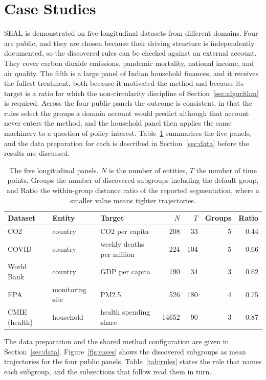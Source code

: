 \section{Case Studies}
\label{sec:cases}

SEAL is demonstrated on five longitudinal datasets from different domains. Four are public, and they are chosen because their driving structure is independently documented, so the discovered rules can be checked against an external account. They cover carbon dioxide emissions, pandemic mortality, national income, and air quality. The fifth is a large panel of Indian household finances, and it receives the fullest treatment, both because it motivated the method and because its target is a ratio for which the non-circularity discipline of Section~\ref{sec:algorithm} is required. Across the four public panels the outcome is consistent, in that the rules select the groups a domain account would predict although that account never enters the method, and the household panel then applies the same machinery to a question of policy interest. Table~\ref{tab:datasets} summarises the five panels, and the data preparation for each is described in Section~\ref{sec:data} before the results are discussed.

\begin{table}[t]
\centering
\small
\begin{tabular}{lllrrrr}
\toprule
Dataset & Entity & Target & $N$ & $T$ & Groups & Ratio \\
\midrule
CO2 & country & CO2 per capita & 208 & 33 & 5 & 0.44 \\
COVID & country & weekly deaths per million & 224 & 104 & 5 & 0.66 \\
World Bank & country & GDP per capita & 190 & 34 & 3 & 0.62 \\
EPA & monitoring site & PM2.5 & 526 & 180 & 4 & 0.75 \\
CMIE (health) & household & health spending share & 14652 & 90 & 3 & 0.87 \\
\bottomrule
\end{tabular}
\caption{The five longitudinal panels. $N$ is the number of entities, $T$ the number of time points, Groups the number of discovered subgroups including the default group, and Ratio the within-group distance ratio of the reported segmentation, where a smaller value means tighter trajectories.}
\label{tab:datasets}
\end{table}

The data preparation and the shared method configuration are given in Section~\ref{sec:data}. Figure~\ref{fig:cases} shows the discovered subgroups as mean trajectories for the four public panels, Table~\ref{tab:rules} states the rule that names each subgroup, and the subsections that follow read them in turn.

